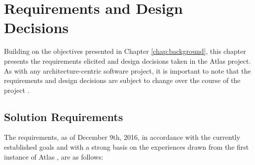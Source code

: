 \chapter{Requirements and Design Decisions}
\label{chap:requirements}

Building on the objectives presented in Chapter \ref{chap:background}, this chapter presents the requirements elicited and design decisions taken in the Atlas project. As with any architecture-centric software project, it is important to note that the requirements and design decisions are subject to change over the course of the project \cite{TAYLOR:2009}.


\section{Solution Requirements}

The requirements, as of December 9th, 2016, in accordance with the currently established goals and with a strong basis on the experiences drawn from the first instance of Atlas \cite{LASER:2015b}, are as follows:

